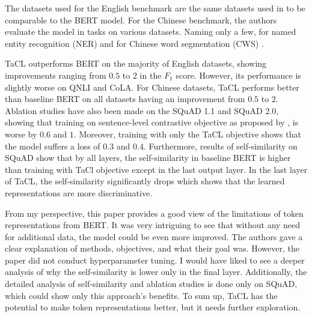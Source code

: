 \documentclass[times, utf8, seminar]{fer}
\begin{document}
The datasets used for the English benchmark are the same datasets used in \citep{devlin2018bert} to be comparable to the BERT model. For the Chinese benchmark, the authors evaluate the model in tasks on various datasets. Naming only a few, for named entity recognition (NER) \citep{weischedel2011ontonotes} \citep{levow2006third} and for Chinese word segmentation (CWS) \citep{emerson2005second}.


TaCL outperforms BERT on the majority of English datasets, showing improvements ranging from $0.5$ to $2$ in the $F_1$ score. However, its performance is slightly worse on QNLI and CoLA. For Chinese datasets, TaCL performs better than baseline BERT on all datasets having an improvement from $0.5$ to $2$. Ablation studies have also been made on the SQuAD 1.1 and SQuAD 2.0, showing that training on sentence-level contrastive objective as proposed by \citep{liu2021fast}, is worse by $0.6$ and $1$. Moreover, training with only the TaCL objective shows that the model suffers a loss of $0.3$ and $0.4$. Furthermore, results of self-similarity on SQuAD show that by all layers, the self-similarity in baseline BERT is higher than training with TaCl objective except in the last output layer. In the last layer of TaCL, the self-similarity significantly drops which shows that the learned representations are more discriminative.


From my perspective, this paper provides a good view of the limitations of token representations from BERT. It was very intriguing to see that without any need for additional data, the model could be even more improved. The authors gave a clear explanation of methods, objectives, and what their goal was. However, the paper did not conduct hyperparameter tuning. I would have liked to see a deeper analysis of why the self-similarity is lower only in the final layer. Additionally, the detailed analysis of self-similarity and ablation studies is done only on SQuAD, which could show only this approach's benefits. To sum up, TaCL has the potential to make token representations better, but it needs further exploration.
\end{document}
